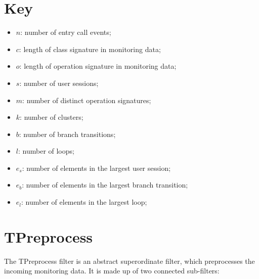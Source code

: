 \documentclass[10pt,a4paper]{article}
\begin{document}
	\section{Key}
	\begin{itemize}
		\item $n$: number of entry call events; \vspace{-0.25cm}
		\item $c$: length of class signature in monitoring data; \vspace{-0.25cm}
		\item $o$: length of operation signature in monitoring data; \vspace{-0.25cm}

		\item $s$: number of user sessions; \vspace{-0,25cm}
		\item $m$: number of distinct operation signatures; \vspace{-0,25cm}
		\item $k$: number of clusters; \vspace{-0,25cm}
		\item $b$: number of branch transitions; \vspace{-0,25cm}
		\item $l$: number of loops; \vspace{-0,25cm}
		\item $e_s$: number of elements in the largest user session; \vspace{-0,25cm}
		\item $e_b$: number of elements in the largest branch transition; \vspace{-0,25cm}
		\item $e_l$: number of elements in the largest loop;
	\end{itemize}
	
	\section{TPreprocess}
	The TPreprocess filter is an abstract superordinate filter, which preprocesses the incoming monitoring data. It is made up of two connected sub-filters:
	
\end{document}

